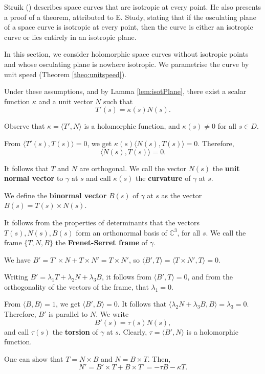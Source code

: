 \documentclass[12pt,a4paper]{article}
\begin{document}
Struik (\cite[Section 1–12]{Struik}) describes space curves that are isotropic at every point.
He also presents a proof of a theorem, attributed to E. Study, stating that if the osculating plane of a space curve is isotropic at every point, then the curve is either an isotropic curve or lies entirely in an isotropic plane.

In this section, we consider holomorphic space curves without isotropic points and whose osculating plane is nowhere isotropic. We parametrise the curve by unit speed (Theorem \ref{theo:unitspeed}).



Under these assumptions, and by Lamma \ref{lem:isotPlane}, there exist a scalar function $\kappa$ and a unit vector $N$ such that
$$
T'(s)=\kappa(s) N(s).
$$

Observe that  $\kappa=\langle T',{N}\rangle$ is a holomorphic function, and $\kappa(s)\ne 0$ for all $s\in D$.


From $\langle T'(s),{T(s)}\rangle=0$, we get
$\kappa(s)\langle N(s),{T(s)}\rangle=0$. Therefore, 
$$
\langle N(s),{T(s)}\rangle=0.
$$

It follows that $T$ and $N$ are orthogonal. We call the vector $N(s)$ the {\bf unit normal vector} to $\gamma$ at $s$ and call $\kappa(s)$ the {\bf curvature} of $\gamma$ at $s$.



We define the {\bf binormal vector} $B(s)$ of $\gamma$ at $s$ as the vector 
$
B(s)=T(s)\times N(s)$. 

It follows from the properties of determinants that the vectors $T(s),N(s),B(s)$ form an orthonormal basis of $\mathbb C^3$, for all $s$. 
We call the frame $\{T,N,B\}$ the \textbf{Frenet-Serret frame} of $\gamma$.


We have $B'=T'\times N+T\times N'= T\times N'$, so 
$\langle B',{T}\rangle=\langle T\times N',{T}\rangle=0.$

Writing $B'=\lambda_1 T+\lambda_2 N+\lambda_3 B$, it follows 
from $\langle B',{T}\rangle=0$, and from the orthogonality of the vectors of the frame, that $\lambda_1=0$.

From $\langle B,B\rangle=1$, we get $\langle B',B\rangle=0$. 
It follows that
$\langle \lambda_2 N+\lambda_3 B,B\rangle=\lambda_3=0$. Therefore, $B'$ is parallel to $N$. We write
$$
B'(s)=\tau(s) N(s),
$$
and call $\tau(s)$ the {\bf torsion} of $\gamma$ at $s$. Clearly, $\tau=\langle B',{N}\rangle$ is a holomorphic function.

One can show that $T=N\times B$ and $N=B\times T$.
Then, 
$$
N'=B'\times T+B\times T'=-\tau B-\kappa T.
$$ 
\end{document}
